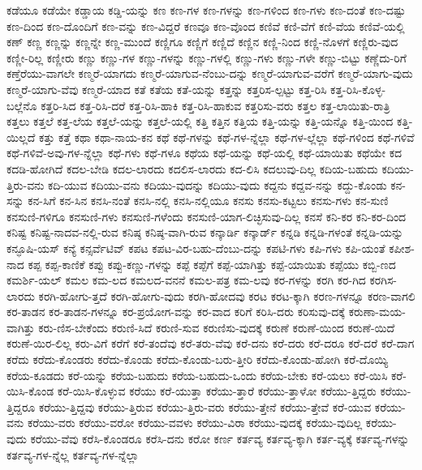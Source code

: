 {ಕಡೆಯೂ
ಕಡೆಯೇ
ಕಡ್ಡಾಯ
ಕಡ್ಡಿ-ಯನ್ನು
ಕಣ
ಕಣ-ಗಳ
ಕಣ-ಗಳನ್ನು
ಕಣ-ಗಳಿಂದ
ಕಣ-ಗಳು
ಕಣ-ದಂತೆ
ಕಣ-ದಷ್ಟು
ಕಣ-ದಿಂದ
ಕಣ-ದೊಂದಿಗೆ
ಕಣ-ವನ್ನು
ಕಣ-ವಿದ್ದರೆ
ಕಣವೂ
ಕಣ-ವೊಂದ
ಕಣಿವೆ
ಕಣಿ-ವೆಗೆ
ಕಣಿ-ವೆಯ
ಕಣಿವೆ-ಯಲ್ಲಿ
ಕಣ್
ಕಣ್ಣ
ಕಣ್ಣನ್ನು
ಕಣ್ಣನ್ನೇ
ಕಣ್ಣ-ಮುಂದೆ
ಕಣ್ಣಿಗೂ
ಕಣ್ಣಿಗೆ
ಕಣ್ಣಿದೆ
ಕಣ್ಣಿನ
ಕಣ್ಣಿ-ನಿಂದ
ಕಣ್ಣಿ-ನೊಳಗೆ
ಕಣ್ಣಿರು-ವುದ
ಕಣ್ಣೀ-ರಿಲ್ಲ
ಕಣ್ಣೀರು
ಕಣ್ಣು
ಕಣ್ಣು-ಗಳ
ಕಣ್ಣು-ಗಳನ್ನು
ಕಣ್ಣು-ಗಳಲ್ಲಿ
ಕಣ್ಣು-ಗಳು
ಕಣ್ಣು-ಗಳೇ
ಕಣ್ಣು-ಬಿಟ್ಟು
ಕಣ್ಣೆದು-ರಿಗೆ
ಕಣ್ತೆರೆಯು-ವಾಗಲೇ
ಕಣ್ಮರೆ-ಯಾಗದು
ಕಣ್ಮರೆ-ಯಾಗುವ-ನೆಂಬು-ದನ್ನು
ಕಣ್ಮರೆ-ಯಾಗುವ-ವರೆಗೆ
ಕಣ್ಮರೆ-ಯಾಗು-ವುದು
ಕಣ್ಮರೆ-ಯಾಗು-ವೆವು
ಕಣ್ಮರೆ-ಯಾದ
ಕತೆ
ಕತೆಯ
ಕತೆ-ಯನ್ನು
ಕತ್ತನ್ನು
ಕತ್ತರಿಸ-ಲ್ಪಟ್ಟು
ಕತ್ತ-ರಿಸಿ
ಕತ್ತ-ರಿಸಿ-ಕೊಳ್ಳ-ಬಲ್ಲೆನೊ
ಕತ್ತರಿ-ಸಿದ
ಕತ್ತ-ರಿಸಿ-ದರೆ
ಕತ್ತ-ರಿಸಿ-ಹಾಕಿ
ಕತ್ತ-ರಿಸಿ-ಹಾಕುವ
ಕತ್ತರಿಸು-ವರು
ಕತ್ತಲ
ಕತ್ತ-ಲಾಯಿತು-ರಾತ್ರಿ
ಕತ್ತಲು
ಕತ್ತಲೆ
ಕತ್ತ-ಲೆಯ
ಕತ್ತಲೆ-ಯನ್ನು
ಕತ್ತಲೆ-ಯಲ್ಲಿ
ಕತ್ತಿ
ಕತ್ತಿನ
ಕತ್ತಿಯ
ಕತ್ತಿ-ಯನ್ನು
ಕತ್ತಿ-ಯನ್ನೊ
ಕತ್ತಿ-ಯಿಂದ
ಕತ್ತಿ-ಯಿಲ್ಲದೆ
ಕತ್ತು
ಕತ್ತೆ
ಕಥಾ
ಕಥಾ-ನಾಯ-ಕನ
ಕಥೆ
ಕಥೆ-ಗಳನ್ನು
ಕಥೆ-ಗಳ-ನ್ನೆಲ್ಲಾ
ಕಥೆ-ಗಳ-ಲ್ಲೆಲ್ಲಾ
ಕಥೆ-ಗಳಿಂದ
ಕಥೆ-ಗಳಿವೆ
ಕಥೆ-ಗಳಿವೆ-ಅವು-ಗಳ-ನ್ನೆಲ್ಲಾ
ಕಥೆ-ಗಳು
ಕಥೆ-ಗಳೂ
ಕಥೆಯ
ಕಥೆ-ಯನ್ನು
ಕಥೆ-ಯಲ್ಲಿ
ಕಥೆ-ಯಾಯಿತು
ಕಥೆಯೇ
ಕದ
ಕದಡಿ-ಹೋಗಿದೆ
ಕದಲ-ಬೇಡಿ
ಕದಲ-ಲಾರದು
ಕದಲಿಸ-ಲಾರದು
ಕದ-ಲಿಸಿ
ಕದಲುವು-ದಿಲ್ಲ
ಕದಿಯ-ಬಹುದು
ಕದಿಯು-ತ್ತಿರು-ವನು
ಕದಿ-ಯುವ
ಕದಿಯು-ವನು
ಕದಿಯು-ವುದನ್ನು
ಕದಿಯು-ವುದು
ಕದ್ದನು
ಕದ್ದವ-ನನ್ನು
ಕದ್ದು-ಕೊಂಡು
ಕನ-ಸನ್ನು
ಕನ-ಸಿಗೆ
ಕನ-ಸಿನ
ಕನಸಿ-ನಂತೆ
ಕನಸಿ-ನಲ್ಲಿ
ಕನಸಿ-ನಲ್ಲಿಯೂ
ಕನಸು
ಕನಸು-ಕಟ್ಟಲು
ಕನಸು-ಗಳು
ಕನ-ಸುಣಿ
ಕನಸುಣಿ-ಗಳಿಗೂ
ಕನಸುಣಿ-ಗಳು
ಕನಸುಣಿ-ಗಳೆಂದು
ಕನಸುಣಿ-ಯಾಗ-ಲಿಚ್ಛಿಸುವು-ದಿಲ್ಲ
ಕನಸೆ
ಕನಿ-ಕರ
ಕನಿ-ಕರ-ದಿಂದ
ಕನಿಷ್ಟ
ಕನಿಷ್ಟ-ನಾದವ-ನಲ್ಲಿ-ರುವ
ಕನಿಷ್ಠ
ಕನಿಷ್ಠ-ವಾಗಿ-ರುವ
ಕನ್ಕಾರ್ಡಿ
ಕನ್ಕಾರ್ಡ್
ಕನ್ನಡಿ
ಕನ್ನಡಿ-ಗಳಂತೆ
ಕನ್ನಡಿ-ಯನ್ನು
ಕನ್ಫೂಷಿ-ಯಸ್
ಕನ್ಯೆ
ಕನ್ಸರ್ವೆಟಿವ್
ಕಪಟ
ಕಪಟ-ವಿರ-ಬಹು-ದೆಂಬು-ದನ್ನು
ಕಪಟಿ-ಗಳು
ಕಪಿ-ಗಳು
ಕಪಿ-ಯಂತೆ
ಕಪೀಶ-ನಾದ
ಕಪ್ಪ
ಕಪ್ಪ-ಕಾಣಿಕೆ
ಕಪ್ಪು
ಕಪ್ಪು-ಕಣ್ಣು-ಗಳನ್ನು
ಕಪ್ಪೆ
ಕಪ್ಪೆಗೆ
ಕಪ್ಪೆ-ಯಾಗಿತ್ತು
ಕಪ್ಪೆ-ಯಾಯಿತು
ಕಪ್ಪೆಯು
ಕಬ್ಬಿ-ಣದ
ಕಮರ್ಶಿ-ಯಲ್
ಕಮಲ
ಕಮ-ಲದ
ಕಮಲದ-ವನನೆ
ಕಮಲ-ಪತ್ರ
ಕಮ-ಲವು
ಕರ-ಗಳನ್ನು
ಕರಗಿ
ಕರ-ಗಿದ
ಕರಗಿಸ-ಲಾರದು
ಕರಗಿ-ಹೋಗು-ತ್ತದೆ
ಕರಗಿ-ಹೋಗು-ವುದು
ಕರಗಿ-ಹೋದವು
ಕರಟ
ಕರಟ-ಕ್ಕಾಗಿ
ಕರಣ-ಗಳನ್ನೂ
ಕರಣ-ವಾಗಲಿ
ಕರ-ತಾಡನ
ಕರ-ತಾಡನ-ಗಳನ್ನೂ
ಕರ-ಪ್ರಯೋಗ-ವನ್ನು
ಕರ-ವಾದ
ಕರಿಗೆ
ಕರಿಸಿ-ದರು
ಕರಿಸುವು-ದಕ್ಕೆ
ಕರುಣಾ-ಮಯ-ವಾಗಿತ್ತು
ಕರು-ಣಿಸ-ಬೇಕೆಂದು
ಕರುಣಿ-ಸಿದೆ
ಕರುಣಿ-ಸುವ
ಕರುಣಿಸು-ವುದಕ್ಕೆ
ಕರುಣೆ
ಕರುಣೆ-ಯಿಂದ
ಕರುಣೆ-ಯಿದೆ
ಕರುಣೆ-ಯಿರ-ಲಿಲ್ಲ
ಕರು-ವಿಗೆ
ಕರೆಗೆ
ಕರೆ-ತಂದೆವು
ಕರೆ-ತರು-ವೆವು
ಕರೆ-ದನು
ಕರೆ-ದರು
ಕರೆ-ದರೂ
ಕರೆ-ದರೆ
ಕರೆ-ದಾಗ
ಕರೆದು
ಕರೆದು-ಕೊಂಡರು
ಕರೆದು-ಕೊಂಡು
ಕರೆದು-ಕೊಂಡು-ಬರು-ತ್ತೀರಿ
ಕರೆದು-ಕೊಂಡು-ಹೋಗಿ
ಕರೆ-ದೊಯ್ಯಿ
ಕರೆಯ-ಕೂಡದು
ಕರೆ-ಯನ್ನು
ಕರೆಯ-ಬಹುದು
ಕರೆಯ-ಬಹುದು-ಒಂದು
ಕರೆಯ-ಬೇಕು
ಕರೆ-ಯಲು
ಕರೆ-ಯಿಸಿ
ಕರೆ-ಯಿಸಿ-ಕೊಂಡ
ಕರೆ-ಯಿಸಿ-ಕೊಳ್ಳುವ
ಕರೆಯು
ಕರೆ-ಯುತ್ತಾ
ಕರೆಯು-ತ್ತಾರೆ
ಕರೆಯು-ತ್ತಾಳೋ
ಕರೆಯು-ತ್ತಿದ್ದರು
ಕರೆಯು-ತ್ತಿದ್ದರೂ
ಕರೆಯು-ತ್ತಿದ್ದವು
ಕರೆಯು-ತ್ತಿರುವ
ಕರೆಯು-ತ್ತಿರು-ವರು
ಕರೆಯು-ತ್ತೇನೆ
ಕರೆಯು-ತ್ತೇವೆ
ಕರೆ-ಯುವ
ಕರೆಯು-ವನು
ಕರೆಯು-ವರು
ಕರೆಯು-ವರೋ
ಕರೆಯು-ವವಳು
ಕರೆಯು-ವಿರಾ
ಕರೆಯು-ವುದಕ್ಕೆ
ಕರೆಯು-ವುದಿಲ್ಲ
ಕರೆಯು-ವುದು
ಕರೆಯು-ವೆವು
ಕರೆಸಿ-ಕೊಂಡರೂ
ಕರೆಸಿ-ದನು
ಕರೋ
ಕರ್ಣ
ಕರ್ತವ್ಯ
ಕರ್ತವ್ಯ-ಕ್ಕಾಗಿ
ಕರ್ತ-ವ್ಯಕ್ಕೆ
ಕರ್ತವ್ಯ-ಗಳನ್ನು
ಕರ್ತವ್ಯ-ಗಳ-ನ್ನೆಲ್ಲ
ಕರ್ತವ್ಯ-ಗಳ-ನ್ನೆಲ್ಲಾ
}
